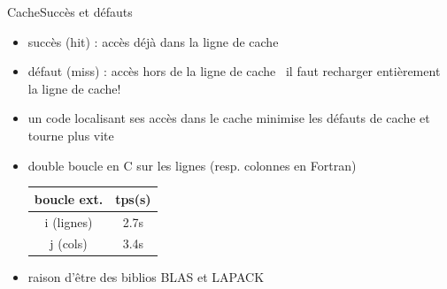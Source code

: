 \documentclass[11pt,mathserif]{beamer}
\newcommand{\gezi}{\faLongArrowRight}
\newcommand{\hand}{\faHandORight}
\newcommand{\argi}{\faLightbulbO}
\newcommand{\pozik}{\faSmileO}
\newcommand{\triste}{\faFrownO}
\newcommand{\adibi}{\faCommentO}
\begin{document}
\begin{frame}{Cache}{Succès et défauts}
\begin{itemize}[<+->]
  \item[\pozik] succès (hit) : accès déjà dans la ligne de cache 
  \item[\triste] défaut (miss) : accès hors de la ligne de cache \gezi\ il faut recharger entièrement la ligne de cache!
  \item[\argi] un code localisant ses accès dans le cache minimise les défauts de cache et tourne plus vite
  \item[\adibi] double boucle en C sur les lignes (resp. colonnes en Fortran)
\begin{minipage}[c]{0.49\linewidth}
  
\end{minipage}
\begin{minipage}[r]{0.49\linewidth}
    \begin{tabular}{|c|c|}
    \hline
     boucle ext. & tps(s)  \\
    \hline
      i (lignes) & 2.7s \\
      j (cols)  & 3.4s \\
    \hline
    \end{tabular}
\end{minipage}
\item[\hand] raison d'être des biblios BLAS et LAPACK
\end{itemize}
\end{frame}

\end{document}
